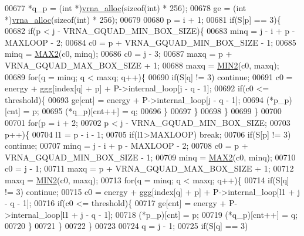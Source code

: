 \begin{DoxyCode}
00677   *q\_p  = (\textcolor{keywordtype}{int} *)\hyperlink{group__utils_gaf37a0979367c977edfb9da6614eebe99}{vrna\_alloc}(\textcolor{keyword}{sizeof}(\textcolor{keywordtype}{int}) * 256);
00678   ge    = (\textcolor{keywordtype}{int} *)\hyperlink{group__utils_gaf37a0979367c977edfb9da6614eebe99}{vrna\_alloc}(\textcolor{keyword}{sizeof}(\textcolor{keywordtype}{int}) * 256);
00679 
00680   p = i + 1;
00681   \textcolor{keywordflow}{if}(S[p] == 3)\{
00682     \textcolor{keywordflow}{if}(p < j - VRNA\_GQUAD\_MIN\_BOX\_SIZE)\{
00683       minq  = j - i + p - MAXLOOP - 2;
00684       c0    = p + VRNA\_GQUAD\_MIN\_BOX\_SIZE - 1;
00685       minq  = \hyperlink{group__utils_gadd91367918fadbc8d585940d6206d6d2}{MAX2}(c0, minq);
00686       c0    = j - 3;
00687       maxq  = p + VRNA\_GQUAD\_MAX\_BOX\_SIZE + 1;
00688       maxq  = \hyperlink{group__utils_ga2dd4a927a7f937f43a90c144d79107d8}{MIN2}(c0, maxq);
00689       \textcolor{keywordflow}{for}(q = minq; q < maxq; q++)\{
00690         \textcolor{keywordflow}{if}(S[q] != 3) \textcolor{keywordflow}{continue};
00691         c0  = energy + ggg[index[q] + p] + P->internal\_loop[j - q - 1];
00692         \textcolor{keywordflow}{if}(c0 <= threshold)\{
00693           ge[cnt]       = energy + P->internal\_loop[j - q - 1];
00694           (*p\_p)[cnt]   = p;
00695           (*q\_p)[cnt++] = q;
00696         \}
00697       \}
00698     \}
00699   \}
00700 
00701   \textcolor{keywordflow}{for}(p = i + 2;
00702       p < j - VRNA\_GQUAD\_MIN\_BOX\_SIZE;
00703       p++)\{
00704     l1    = p - i - 1;
00705     \textcolor{keywordflow}{if}(l1>MAXLOOP) \textcolor{keywordflow}{break};
00706     \textcolor{keywordflow}{if}(S[p] != 3) \textcolor{keywordflow}{continue};
00707     minq  = j - i + p - MAXLOOP - 2;
00708     c0    = p + VRNA\_GQUAD\_MIN\_BOX\_SIZE - 1;
00709     minq  = \hyperlink{group__utils_gadd91367918fadbc8d585940d6206d6d2}{MAX2}(c0, minq);
00710     c0    = j - 1;
00711     maxq  = p + VRNA\_GQUAD\_MAX\_BOX\_SIZE + 1;
00712     maxq  = \hyperlink{group__utils_ga2dd4a927a7f937f43a90c144d79107d8}{MIN2}(c0, maxq);
00713     \textcolor{keywordflow}{for}(q = minq; q < maxq; q++)\{
00714       \textcolor{keywordflow}{if}(S[q] != 3) \textcolor{keywordflow}{continue};
00715       c0  = energy + ggg[index[q] + p] + P->internal\_loop[l1 + j - q - 1];
00716         \textcolor{keywordflow}{if}(c0 <= threshold)\{
00717           ge[cnt]       = energy + P->internal\_loop[l1 + j - q - 1];
00718           (*p\_p)[cnt]   = p;
00719           (*q\_p)[cnt++] = q;
00720         \}
00721     \}
00722   \}
00723 
00724   q = j - 1;
00725   \textcolor{keywordflow}{if}(S[q] == 3)

\end{DoxyCode}

